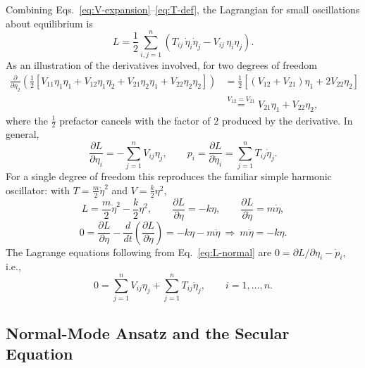 \documentclass[11pt]{article}
\begin{document}
Combining Eqs.~\eqref{eq:V-expansion}--\eqref{eq:T-def}, the Lagrangian for small oscillations about equilibrium is
\begin{equation}
\boxed{L = \frac12\sum_{i,j=1}^{n}\left(T_{ij}\,\dot\eta_i\dot\eta_j - V_{ij}\,\eta_i\eta_j\right).}
\label{eq:L-normal}
\end{equation}
As an illustration of the derivatives involved, for two degrees of freedom
\begin{align*}
\frac{\partial}{\partial\eta_2}\left(\frac12\left[V_{11}\eta_1\eta_1+V_{12}\eta_1\eta_2+V_{21}\eta_2\eta_1+V_{22}\eta_2\eta_2\right]\right)
&=\frac12\left[(V_{12}+V_{21})\eta_1+2V_{22}\eta_2\right]\\
&\overset{V_{12}=V_{21}}{=}V_{21}\eta_1+V_{22}\eta_2,
\end{align*}
where the $\tfrac12$ prefactor cancels with the factor of $2$ produced by the derivative. In general,
\begin{equation}
\frac{\partial L}{\partial\eta_i} = -\sum_{j=1}^n V_{ij}\eta_j, \qquad p_i = \frac{\partial L}{\partial\dot\eta_i} = \sum_{j=1}^n T_{ij}\dot\eta_j.
\end{equation}
For a single degree of freedom this reproduces the familiar simple harmonic oscillator: with $T=\tfrac{m}{2}\dot\eta^2$ and $V=\tfrac{k}{2}\eta^2$,
\begin{equation}
L = \frac{m}{2}\dot\eta^2-\frac{k}{2}\eta^2, \qquad \frac{\partial L}{\partial\eta}=-k\eta, \qquad \frac{\partial L}{\partial\dot\eta}=m\dot\eta,
\end{equation}
\begin{equation}
0 = \frac{\partial L}{\partial\eta}-\frac{d}{dt}\left(\frac{\partial L}{\partial\dot\eta}\right) = -k\eta-m\ddot\eta \ \Longrightarrow\ m\ddot\eta=-k\eta.
\end{equation}
The Lagrange equations following from Eq.~\eqref{eq:L-normal} are $0 = \partial L/\partial\eta_i - \dot p_i$, i.e.,
\begin{equation}
\boxed{0 = \sum_{j=1}^n V_{ij}\eta_j + \sum_{j=1}^n T_{ij}\ddot\eta_j, \qquad i=1,\dots,n.}
\label{eq:EOM}
\end{equation}

\subsection{Normal-Mode Ansatz and the Secular Equation}
\end{document}
